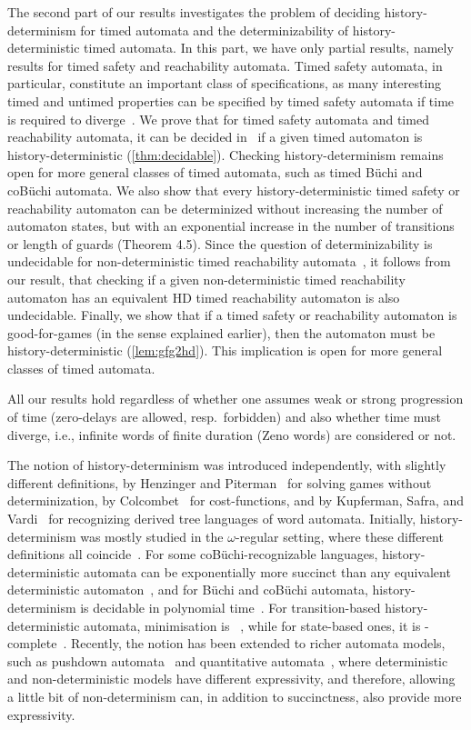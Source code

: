 The second part of our results investigates the problem of deciding
history-determinism for timed automata and the determinizability of
history-deterministic timed automata.
In this part, we have only partial results,
namely results for timed safety and reachability automata.
Timed safety automata, in particular, constitute an important class of
specifications, as many interesting timed and untimed properties
can be specified by timed safety automata if time is required to
diverge~\cite{HNSY1992,HKW95}.
We prove that for timed safety automata and timed reachability automata,
it can be decided in \exptime\ if a given timed automaton is
history-deterministic (\cref{thm:decidable}).
Checking history-determinism remains open for more general classes of
timed automata, such as timed B\"uchi and coB\"uchi automata.
We also show that every history-deterministic timed safety or reachability automaton can be determinized without increasing the number of automaton states, but with an exponential
increase in the number of transitions or length of guards (Theorem 4.5).
Since the question of determinizability is undecidable for non-deterministic
timed reachability automata~\cite{F06},
it follows from our result, that checking if a given
non-deterministic timed reachability automaton has an equivalent HD timed reachability automaton
is also undecidable.
Finally, we show that if a timed safety or reachability automaton is
good-for-games (in the sense explained earlier),
then the automaton must be history-deterministic (\cref{lem:gfg2hd}).
This implication is open for more general classes of timed automata.


All our results hold regardless of whether one assumes weak or strong progression of time (zero-delays are allowed, resp.~forbidden) and also whether time must diverge, i.e., infinite words of finite duration (Zeno words) are considered or not.



\medskip
{}
The notion of history-determinism was introduced independently, with slightly
different definitions, by Henzinger and Piterman~\cite{HP06} for solving games without determinization, by Colcombet~\cite{Col09} for  cost-functions, and by Kupferman, Safra, and Vardi~\cite{KSV06} for recognizing derived tree languages of word automata.
Initially, history-determinism was mostly studied in the $\omega$-regular setting,
where these different definitions all coincide~\cite{BL19}.
For some coB\"uchi-recognizable languages, history-deterministic automata can be
exponentially more succinct than any equivalent deterministic automaton~\cite{KS15},
and for B\"uchi and coB\"uchi automata, history-determinism is decidable in
polynomial time~\cite{BK18,KS15}.
For transition-based history-deterministic automata, minimisation is
\ptime~\cite{RK19}, while for state-based ones, it is \NP-complete~\cite{Sch20}.
Recently, the notion has been extended to richer automata models, such as
pushdown automata~\cite{LZ22,GJLZ21} and quantitative automata~\cite{BL21,BL22},
where deterministic and non-deterministic models have different expressivity,
and therefore, allowing a little bit of non-determinism can, in addition to
succinctness, also provide more expressivity.

